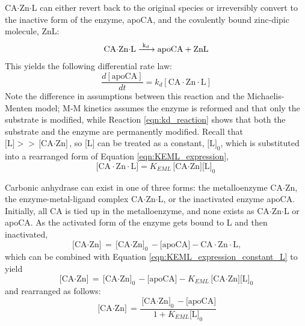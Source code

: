 CA$\cdot$Zn$\cdot$L can either revert back to the original species or irreversibly convert to the inactive form of the enzyme, apoCA, and the covalently bound zinc-dipic molecule, ZnL:
\begin{align}\label{eqn:kd_reaction}
\ce{CA$\cdot$Zn$\cdot$L
->[\ce{k_{d}}]
apoCA + ZnL}
\end{align}
This yields the following differential rate law:
\begin{equation}\label{eqn:kd_expression}
\frac{d[\text{apoCA}]}{dt}=k_{d}[\text{CA$\cdot$Zn$\cdot$L}]
\end{equation}
Note the difference in assumptions between this reaction and the Michaelis-Menten model; M-M kinetics assumes the enzyme is reformed and that only the substrate is modified, while Reaction \eqref{eqn:kd_reaction} shows that both the substrate and the enzyme are permanently modified. Recall that $\text{[L]} >> \text{[CA$\cdot$Zn]}$, so [L] can be treated as a constant, $\text{[L]}_0$, which is substituted into a rearranged form of Equation \eqref{eqn:KEML_expression},
\begin{equation}\label{eqn:KEML_expression_constant_L}
\text{[CA$\cdot$Zn$\cdot$L]}=K_{EML}\text{[CA$\cdot$Zn][L]}_0
\end{equation}

Carbonic anhydrase can exist in one of three forms: the metalloenzyme CA$\cdot$Zn, the enzyme-metal-ligand complex CA$\cdot$Zn$\cdot$L, or the inactivated enzyme apoCA. Initially, all CA is tied up in the metalloenzyme, and none exists as CA$\cdot$Zn$\cdot$L or apoCA. As the activated form of the enzyme gets bound to L and then inactivated,
\begin{equation}\label{eqn:CAZnconc}
\text{[CA$\cdot$Zn]}=\text{[CA$\cdot$Zn]}_0 - \text{[apoCA]} - \text{CA$\cdot$Zn$\cdot$L},
\end{equation}
which can be combined with Equation \eqref{eqn:KEML_expression_constant_L} to yield
\begin{equation}\label{eqn:CAZnconc_EMLsub}
\text{[CA$\cdot$Zn]}=\text{[CA$\cdot$Zn]}_0 - \text{[apoCA]} - K_{EML}\text{[CA$\cdot$Zn][L]}_0
\end{equation}
and rearranged as follows:
\begin{equation}\label{eqn:CAZnconc_EMLsub_rearrange}
\text{[CA$\cdot$Zn]}=\frac{\text{[CA$\cdot$Zn]}_0 - \text{[apoCA]}}{1+K_{EML}\text{[L]}_0}
\end{equation}


